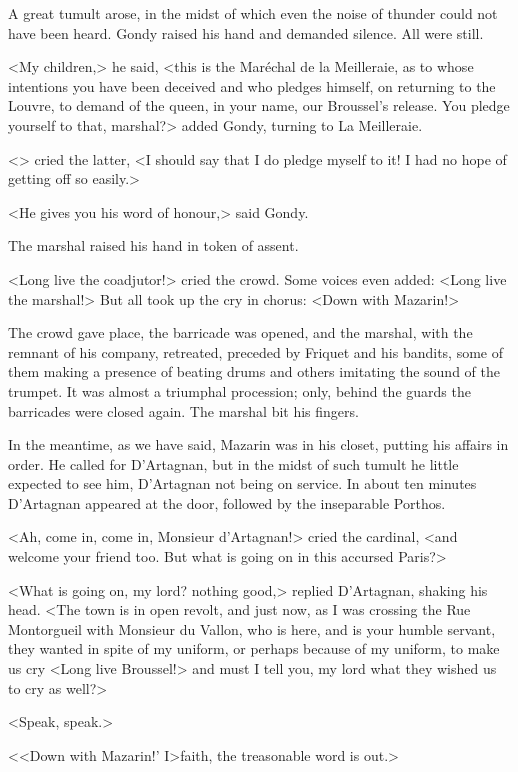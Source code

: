 A great tumult arose, in the midst of which even the noise of thunder could not have been heard. Gondy raised his hand and demanded silence. All were still.

<My children,> he said, <this is the Maréchal de la Meilleraie, as to whose intentions you have been deceived and who pledges himself, on returning to the Louvre, to demand of the queen, in your name, our Broussel's release. You pledge yourself to that, marshal?> added Gondy, turning to La Meilleraie.

<> cried the latter, <I should say that I do pledge myself to it! I had no hope of getting off so easily.>

<He gives you his word of honour,> said Gondy.

The marshal raised his hand in token of assent.

<Long live the coadjutor!> cried the crowd. Some voices even added: <Long live the marshal!> But all took up the cry in chorus: <Down with Mazarin!>

The crowd gave place, the barricade was opened, and the marshal, with the remnant of his company, retreated, preceded by Friquet and his bandits, some of them making a presence of beating drums and others imitating the sound of the trumpet. It was almost a triumphal procession; only, behind the guards the barricades were closed again. The marshal bit his fingers.

In the meantime, as we have said, Mazarin was in his closet, putting his affairs in order. He called for D'Artagnan, but in the midst of such tumult he little expected to see him, D'Artagnan not being on service. In about ten minutes D'Artagnan appeared at the door, followed by the inseparable Porthos.

<Ah, come in, come in, Monsieur d'Artagnan!> cried the cardinal, <and welcome your friend too. But what is going on in this accursed Paris?>

<What is going on, my lord? nothing good,> replied D'Artagnan, shaking his head. <The town is in open revolt, and just now, as I was crossing the Rue Montorgueil with Monsieur du Vallon, who is here, and is your humble servant, they wanted in spite of my uniform, or perhaps because of my uniform, to make us cry <Long live Broussel!> and must I tell you, my lord what they wished us to cry as well?>

<Speak, speak.>

<<Down with Mazarin!' I>faith, the treasonable word is out.>

